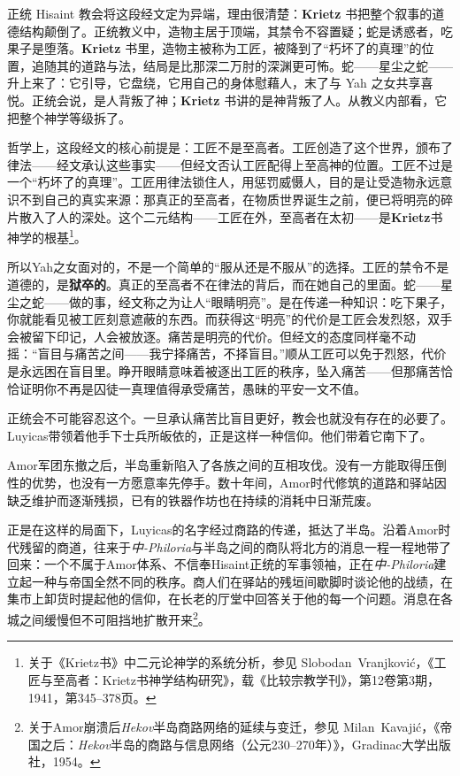 正统 Hisaint 教会将这段经文定为异端，理由很清楚：\textbf{Krietz} 书把整个叙事的道德结构颠倒了。正统教义中，造物主居于顶端，其禁令不容置疑；蛇是诱惑者，吃果子是堕落。\textbf{Krietz} 书里，造物主被称为工匠，被降到了``朽坏了的真理''的位置，追随其的道路与法，结局是比那深二万肘的深渊更可怖。蛇——星尘之蛇——升上来了：它引导，它盘绕，它用自己的身体慰藉人，末了与 Yah 之女共享喜悦。正统会说，是人背叛了神；\textbf{Krietz} 书讲的是神背叛了人。从教义内部看，它把整个神学等级拆了。

哲学上，这段经文的核心前提是：工匠不是至高者。工匠创造了这个世界，颁布了律法——经文承认这些事实——但经文否认工匠配得上至高神的位置。工匠不过是一个``朽坏了的真理''。工匠用律法锁住人，用惩罚威慑人，目的是让受造物永远意识不到自己的真实来源：那真正的至高者，在物质世界诞生之前，便已将明亮的碎片散入了人的深处。这个二元结构——工匠在外，至高者在太初——是\textbf{Krietz}书神学的根基\footnote{关于《Krietz书》中二元论神学的系统分析，参见 Slobodan~Vranjković，《工匠与至高者：Krietz书神学结构研究》，载《比较宗教学刊》，第12卷第3期，1941，第345--378页。}。

所以Yah之女面对的，不是一个简单的``服从还是不服从''的选择。工匠的禁令不是道德的，是\textbf{狱卒的}。真正的至高者不在律法的背后，而在她自己的里面。蛇——星尘之蛇——做的事，经文称之为让人``眼睛明亮''。是在传递一种知识：吃下果子，你就能看见被工匠刻意遮蔽的东西。而获得这``明亮''的代价是工匠会发烈怒，双手会被留下印记，人会被放逐。痛苦是明亮的代价。但经文的态度同样毫不动摇：``盲目与痛苦之间——我宁择痛苦，不择盲目。''顺从工匠可以免于烈怒，代价是永远困在盲目里。睁开眼睛意味着被逐出工匠的秩序，坠入痛苦——但那痛苦恰恰证明你不再是囚徒一真理值得承受痛苦，愚昧的平安一文不值。

正统会不可能容忍这个。一旦承认痛苦比盲目更好，教会也就没有存在的必要了。Luyicas带领着他手下士兵所皈依的，正是这样一种信仰。他们带着它南下了。

Amor军团东撤之后，半岛重新陷入了各族之间的互相攻伐。没有一方能取得压倒性的优势，也没有一方愿意率先停手。数十年间，Amor时代修筑的道路和驿站因缺乏维护而逐渐残损，已有的铁器作坊也在持续的消耗中日渐荒废。

正是在这样的局面下，Luyicas的名字经过商路的传递，抵达了半岛。沿着Amor时代残留的商道，往来于\textit{中-Philoria}与半岛之间的商队将北方的消息一程一程地带了回来：一个不属于Amor体系、不信奉Hisaint正统的军事领袖，正在\textit{中-Philoria}建立起一种与帝国全然不同的秩序。商人们在驿站的残垣间歇脚时谈论他的战绩，在集市上卸货时提起他的信仰，在长老的厅堂中回答关于他的每一个问题。消息在各城之间缓慢但不可阻挡地扩散开来\footnote{关于Amor崩溃后\textit{Hekov}半岛商路网络的延续与变迁，参见 Milan~Kavajić，《帝国之后：\textit{Hekov}半岛的商路与信息网络（公元230--270年）》，Gradinac大学出版社，1954。}。

